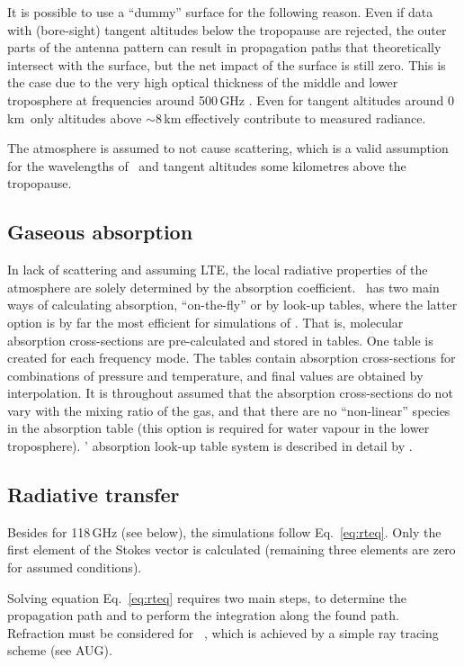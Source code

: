 It is possible to use a ``dummy'' surface for the following reason. Even if
data with (bore-sight) tangent altitudes below the tropopause are rejected, the
outer parts of the antenna pattern can result in propagation paths that
theoretically intersect with the surface, but the net impact of the surface is
still zero. This is the case due to the very high optical thickness of the
middle and lower troposphere at frequencies around 500\,GHz
\citep{ekstrom:first:07}. Even for tangent altitudes around 0\,km\ only
altitudes above $\sim$8\,km effectively contribute to measured radiance.

The atmosphere is assumed to not cause scattering, which is a valid assumption
for the wavelengths of \smr\ and tangent altitudes some kilometres above the
tropopause. 


\subsection{Gaseous absorption}
%
In lack of scattering and assuming LTE, the local radiative properties of the
atmosphere are solely determined by the absorption coefficient. \ARTS\ has two
main ways of calculating absorption, ``on-the-fly'' or by look-up tables, where
the latter option is by far the most efficient for simulations of \smr. That
is, molecular absorption cross-sections are pre-calculated and stored in
tables. One table is created for each frequency mode. The tables contain
absorption cross-sections for combinations of pressure and temperature, and
final values are obtained by interpolation. It is throughout assumed that the
absorption cross-sections do not vary with the mixing ratio of the gas, and that
there are no ``non-linear'' species in the absorption table (this option is
required for water vapour in the lower troposphere).
\ARTS' absorption look-up table system is described in detail by
\citet{buehler:absor:11}. 


\subsection{Radiative transfer}
%
Besides for 118\,GHz (see below), the simulations follow Eq.~\ref{eq:rteq}. Only
the first element of the Stokes vector is calculated (remaining three elements
are zero for assumed conditions).

Solving equation Eq.~\ref{eq:rteq} requires two main steps, to determine the
propagation path and to perform the integration along the found path.
Refraction must be considered for \smr\ \citep{eriksson:studi:02}, which is
achieved by a simple ray tracing scheme (see AUG). 

